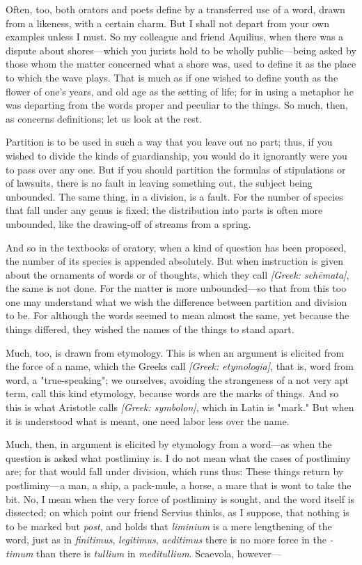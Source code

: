  Often, too, both orators and poets define by a transferred use of a word, drawn from a likeness, with a certain charm. But I shall not depart from your own examples unless I must. So my colleague and friend Aquilius, when there was a dispute about shores—which you jurists hold to be wholly public—being asked by those whom the matter concerned what a shore was, used to define it as the place to which the wave plays. That is much as if one wished to define youth as the flower of one's years, and old age as the setting of life; for in using a metaphor he was departing from the words proper and peculiar to the things. So much, then, as concerns definitions; let us look at the rest.

 Partition is to be used in such a way that you leave out no part; thus, if you wished to divide the kinds of guardianship, you would do it ignorantly were you to pass over any one. But if you should partition the formulas of stipulations or of lawsuits, there is no fault in leaving something out, the subject being unbounded. The same thing, in a division, is a fault. For the number of species that fall under any genus is fixed; the distribution into parts is often more unbounded, like the drawing-off of streams from a spring.

 And so in the textbooks of oratory, when a kind of question has been proposed, the number of its species is appended absolutely. But when instruction is given about the ornaments of words or of thoughts, which they call \textit{[Greek: schēmata]}, the same is not done. For the matter is more unbounded—so that from this too one may understand what we wish the difference between partition and division to be. For although the words seemed to mean almost the same, yet because the things differed, they wished the names of the things to stand apart.

 Much, too, is drawn from etymology. This is when an argument is elicited from the force of a name, which the Greeks call \textit{[Greek: etymologia]}, that is, word from word, a "true-speaking"; we ourselves, avoiding the strangeness of a not very apt term, call this kind etymology, because words are the marks of things. And so this is what Aristotle calls \textit{[Greek: symbolon]}, which in Latin is "mark." But when it is understood what is meant, one need labor less over the name.

 Much, then, in argument is elicited by etymology from a word—as when the question is asked what postliminy is. I do not mean what the cases of postliminy are; for that would fall under division, which runs thus: These things return by postliminy—a man, a ship, a pack-mule, a horse, a mare that is wont to take the bit. No, I mean when the very force of postliminy is sought, and the word itself is dissected; on which point our friend Servius thinks, as I suppose, that nothing is to be marked but \textit{post}, and holds that \textit{liminium} is a mere lengthening of the word, just as in \textit{finitimus}, \textit{legitimus}, \textit{aeditimus} there is no more force in the \textit{-timum} than there is \textit{tullium} in \textit{meditullium}. Scaevola, however—

